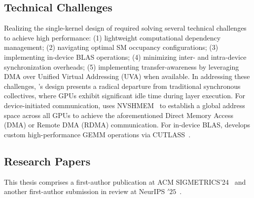 \subsection{Technical Challenges}\label{subsec:technical-challenges}
Realizing the single-kernel design of \sysname required
solving several technical challenges to achieve high performance:
(1) lightweight computational dependency management; (2)
navigating optimal SM occupancy configurations; (3) implementing in-device BLAS operations;
(4) minimizing inter- and intra-device synchronization overheads; (5) implementing transfer-awareness by leveraging
DMA over Unified Virtual Addressing (UVA) when available.
In addressing these challenges, \sysname's design presents a
radical departure from traditional synchronous \alltoall collectives,
where GPUs exhibit significant idle time during layer execution.
For device-initiated communication,
\sysname uses NVSHMEM~\cite{nvshm} to establish a global address space across all GPUs to
achieve the aforementioned Direct Memory Access (DMA) or Remote DMA (RDMA) communication.
For in-device BLAS, \sysname develops custom high-performance GEMM operations via CUTLASS~\cite{Thakkar_CUTLASS_2023}.
\subsection{Research Papers}\label{subsec:research-papers}
This thesis comprises a first-author publication at ACM SIGMETRICS'24~\cite{10.1145/3725536.3725539}
and another first-author submission in review at NeurIPS \('25\)~\cite{flasharxiv}.

